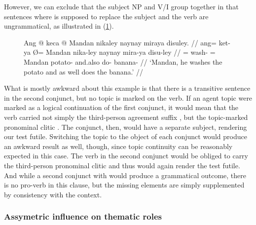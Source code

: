 \begin{figure}

\xe
\end{figure}

However, we can exclude that the subject NP and V/I group together in that
sentences where  is supposed to replace the subject and
the verb are ungrammatical, as illustrated in (\ref{ex:ayrvconst4}).

\begin{figure}[h]
\ex\label{ex:ayrvconst4}%
\ljudge*\begingl
\gla Ang @ keca {} @ Mandan nikaley naynay miraya disuley. //
\glb ang= ket-ya Ø= Mandan nika-ley naynay mira-ya disu-ley //
\glc \AgtT{}= wash-\TsgM{} \Top{}= Mandan potato-\PargI{} and.also do-\TsgM{}
	banana-\PargI{} //
\glft `Mandan, he washes the potato and as well does the banana.' //
\endgl\xe
\end{figure}

What is mostly awkward about this example is that there is a transitive
sentence in the second conjunct, but no topic is marked on the verb. If an
agent topic were marked as a logical continuation of the first conjunct, it
would mean that the verb carried not simply the third-person agreement suffix
, but the topic-marked pronominal clitic
. The conjunct, then, would have a separate subject,
rendering our test futile. Switching the topic to the object of each conjunct
would produce an awkward result as well, though, since topic continuity can be
reasonably expected in this case. The verb in the second conjunct would be
obliged to carry the third-person pronominal clitic 
and thus would again render the test futile. And while a second conjunct with
 would produce a
grammatical outcome, there is no pro-verb in this clause, but the missing
elements are simply supplemented by consistency with the context.

\subsubsection{Assymetric influence on thematic roles}

